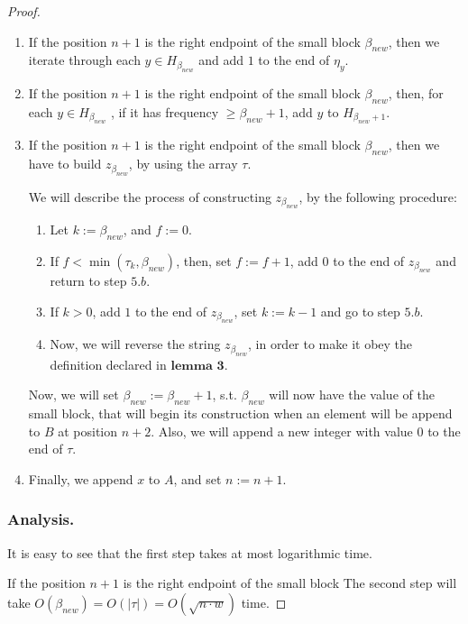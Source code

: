 \documentclass[runningheads]{llncs}
\begin{document}
\begin{proof}
\begin{enumerate}
        \item If the position $n+1$ is the right endpoint of the small block $\beta_{new}$, then we iterate through each $y\in H_{\beta_{new}}$ and add $1$ to the end of $\eta_{y}$.
        
        \item If the position $n+1$ is the right endpoint of the small block $\beta_{new}$, then, for each $y \in H_{\beta_{new}}$ , if it has frequency $\geq\beta_{new}+1$, 
        add $y$ to $H_{\beta_{new}+1}$.
        
        \item If the position $n+1$ is the right endpoint of the small block $\beta_{new}$, then we have to build $z_{\beta_{new}}$, by using the array $\tau$. 
        
        We will describe the process of constructing $z_{\beta_{new}}$, by the following procedure:
        \begin{enumerate}
            \item Let $k:=\beta_{new}$, and $f:=0$.
            \item If $f < \min(\tau_{k}, \beta_{new})$, then, set $f:=f+1$, add $0$ to the end of $z_{\beta_{new}}$ and return to step $5.b$.
            \item If $k>0$, add $1$ to the end of $z_{\beta_{new}}$, set $k:=k-1$ and go to step $5.b$.
            \item Now, we will reverse the string $z_{\beta_{new}}$, in order to make it obey the definition declared in $\textbf{lemma 3}$.
        \end{enumerate}

        Now, we will set $\beta_{new}:=\beta_{new}+1$, s.t. $\beta_{new}$ will now have the value of the small block, that will begin its construction when 
        an element will be append to $B$ at position $n+2$. Also, we will append a new integer with value $0$ to the end of $\tau$.

        

        \item Finally, we append $x$ to $A$, and set $n:=n+1$.
    \end{enumerate}

    \subsubsection{Analysis.}
    
    It is easy to see that the first step takes at most logarithmic time. \item If the position $n+1$ is the right endpoint of the small block 
    The second step will take $O(\beta_{new})=O(|\tau|)=O(\sqrt{n\cdot w})$ time.


\end{proof}
\end{document}
